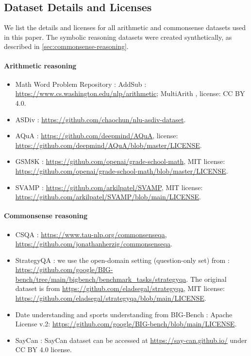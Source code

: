 \documentclass[]{article}
\theoremstyle{plain}
\theoremstyle{definition}
\theoremstyle{remark}
\begin{document}
\subsection{Dataset Details and Licenses}\label{subsec:licenses}
We list the details and licenses for all arithmetic and commonsense datasets used in this paper. The symbolic reasoning datasets were created synthetically, as described in \cref{sec:commonsense-reasoning}.

\paragraph{Arithmetic reasoning}
\begin{itemize}
    \item Math Word Problem Repository \citep{koncel-kedziorski-etal-2016-mawps}:
    AddSub \citep{hosseini-etal-2014-learning}:  \url{https://www.cs.washington.edu/nlp/arithmetic}; 
    MultiArith \citep{roy-roth-2015-solving}, license: CC BY 4.0.
    \item ASDiv \citep{miao-etal-2020-diverse}: \url{https://github.com/chaochun/nlu-asdiv-dataset}.
    \item AQuA \citep{ling-etal-2017-program}: \url{https://github.com/deepmind/AQuA}, license: \url{https://github.com/deepmind/AQuA/blob/master/LICENSE}.
    \item GSM8K \citep{cobbe2021training}: \url{https://github.com/openai/grade-school-math}, MIT license: \url{https://github.com/openai/grade-school-math/blob/master/LICENSE}.
    \item SVAMP \citep{patel-etal-2021-nlp}: \url{https://github.com/arkilpatel/SVAMP}, MIT license: \url{https://github.com/arkilpatel/SVAMP/blob/main/LICENSE}.
\end{itemize}

\paragraph{Commonsense reasoning}
\begin{itemize}
\item CSQA \citep{talmor-etal-2019-commonsenseqa}: \url{https://www.tau-nlp.org/commonsenseqa}, \url{https://github.com/jonathanherzig/commonsenseqa}.
\item StrategyQA \citep{geva-etal-2021-aristotle}: we use the open-domain setting (question-only set) from  \cite{bigbench}: \url{https://github.com/google/BIG-bench/tree/main/bigbench/benchmark_tasks/strategyqa}.
The original dataset is from \url{https://github.com/eladsegal/strategyqa}, MIT license: \url{https://github.com/eladsegal/strategyqa/blob/main/LICENSE}.
\item Date understanding and sports understanding from BIG-Bench \citep{bigbench}: Apache License v.2: \url{https://github.com/google/BIG-bench/blob/main/LICENSE}.
\item SayCan \citep{ahn2022can}: SayCan dataset can be accessed at \url{https://say-can.github.io/} under CC BY 4.0 license.

\end{itemize}
\end{document}
